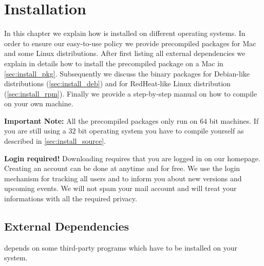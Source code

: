 \section{Installation}
\label{sec:install}

In this chapter we explain how {\twodx} is installed on different operating systems. In order to ensure our easy-to-use policy we provide precompiled packages for Mac and some Linux distributions. After first listing all external dependencies we explain in details how to install the precompiled package on a Mac in \autoref{sec:install_pkg}. Subsequently we discuss the binary packages for Debian-like distributions (\autoref{sec:install_deb}) and for RedHeat-like Linux distribution (\autoref{sec:install_rpm}). Finally we provide a step-by-step manual on how to compile {\twodx} on your own machine.

\textbf{Important Note:} All the precompiled packages only run on $64$ bit machines. If you are still using a $32$ bit operating system you have to compile {\twodx} yourself as described in \autoref{sec:install_source}.

\textbf{Login required!} Downloading {\twodx} requires that you are logged in on our homepage. Creating an account can be done at anytime and for free. We use the login mechanism for tracking all users and to inform you about new {\twodx} versions and upcoming events. We will not spam your mail account and will treat your informations with all the required privacy.

\subsection{External Dependencies}
\label{sec:2dxdeps}
{\twodx} depends on some third-party programs which have to be installed on your system. 


